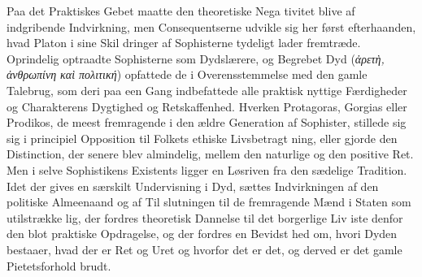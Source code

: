 \documentclass[12pt,a4paper]{book}
\newcommand{\gk}[1]{\textit{#1}}
\begin{document}
Paa det Praktiskes Gebet maatte den theoretiske Nega\-%
tivitet blive af indgribende Indvirkning, men Consequentserne
udvikle sig her først efterhaanden, hvad Platon i sine Skil\-%
dringer af Sophisterne tydeligt lader fremtræde. Oprindelig
optraadte Sophisterne som Dydslærere, og Begrebet Dyd (\gk{ἀρετὴ,
ἀνθρωπίνη καὶ πολιτική}) opfattede de i Overensstemmelse med
den gamle Talebrug, som deri paa een Gang indbefattede alle
praktisk nyttige Færdigheder og Charakterens Dygtighed og
Retskaffenhed. Hverken Protagoras, Gorgias eller Prodikos, de
meest fremragende i den ældre Generation af Sophister, stillede
sig sig i principiel Opposition til Folkets ethiske Livsbetragt\-%
ning, eller gjorde den Distinction, der senere blev almindelig,
mellem den naturlige og den positive Ret. Men i selve
Sophistikens Existents ligger en Løsriven fra den sædelige
Tradition. Idet der gives en særskilt Undervisning i Dyd,
sættes Indvirkningen af den politiske Almeenaand og af Til\-%
slutningen til de fremragende Mænd i Staten som utilstrække\-%
lig, der fordres theoretisk Dannelse til det borgerlige Liv iste\-%
denfor den blot praktiske Opdragelse, og der fordres en Bevidst\-%
hed om, hvori Dyden bestaaer, hvad der er Ret og Uret og
hvorfor det er det, og derved er det gamle Pietetsforhold brudt.
\end{document}
